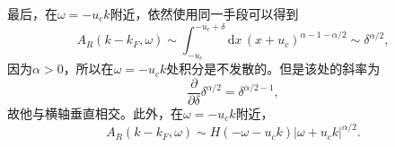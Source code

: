 \documentclass[9pt]{extarticle}
\newcommand{\dd}{\mathrm{d}}
\begin{document}
最后，在$\omega=-u_c k$附近，依然使用同一手段可以得到
\[
	A_R(k-k_F,\omega)\sim \int_{-u_c}^{-u_c+\delta} \dd x \,(x+u_c)^{\alpha-1-\alpha/2}\sim \delta^{\alpha/2},
\]
因为$\alpha>0$，所以在$\omega=-u_c k$处积分是不发散的。但是该处的斜率为
\[
	\frac{\partial }{\partial \delta} \delta^{\alpha/2}=\delta^{\alpha/2-1},
\]
故他与横轴垂直相交。此外，在$\omega=-u_c k$附近，
\[
	A_R(k-k_F,\omega)\sim H(-\omega-u_c k)|\omega + u_c k|^{\alpha/2}.
\]
\end{document}
